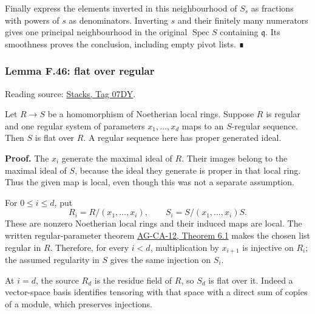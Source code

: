 \documentclass[11pt,a4paper,openany]{report}
\begin{document}
Finally express the elements inverted in this neighbourhood of \(S_s\) as fractions with powers of \(s\) as denominators. Inverting \(s\) and their finitely many numerators gives one principal neighbourhood in the original \(\operatorname{Spec}S\) containing \(\mathfrak q\). Its smoothness proves the conclusion, including empty pivot lists. ∎

\label{AG-RG-S05-algebra-lemma-flat-over-regular}

\subsubsection{Lemma F.46: flat over regular}\label{AG-RG-S05-lemma-f.46-flat-over-regular}

Reading source: \href{https://stacks.math.columbia.edu/tag/07DY}{Stacks, Tag 07DY}.

Let \(R\to S\) be a homomorphism of Noetherian local rings. Suppose \(R\) is regular and one regular system of parameters \(x_1,\ldots,x_d\) maps to an \(S\)-regular sequence. Then \(S\) is flat over \(R\). A regular sequence here has proper generated ideal.

\textbf{Proof.} The \(x_i\) generate the maximal ideal of \(R\). Their images belong to the maximal ideal of \(S\), because the ideal they generate is proper in that local ring. Thus the given map is local, even though this was not a separate assumption.

For \(0\leq i\leq d\), put \[
R_i=R/(x_1,\ldots,x_i),\qquad
S_i=S/(x_1,\ldots,x_i)S.
\] These are nonzero Noetherian local rings and their induced maps are local. The written regular-parameter theorem \href{https://github.com/KokunoYumeto/open-math-courses/blob/d02d0a3669f42579db037cd44de1d113fdd770a1/docs/courses/AG-CA/src/regular-sequences-depth-and-cohen-macaulay-modules.md}{AG-CA-12, Theorem 6.1} makes the chosen list regular in \(R\). Therefore, for every \(i<d\), multiplication by \(x_{i+1}\) is injective on \(R_i\); the assumed regularity in \(S\) gives the same injection on \(S_i\).

At \(i=d\), the source \(R_d\) is the residue field of \(R\), so \(S_d\) is flat over it. Indeed a vector-space basis identifies tensoring with that space with a direct sum of copies of a module, which preserves injections.
\end{document}
